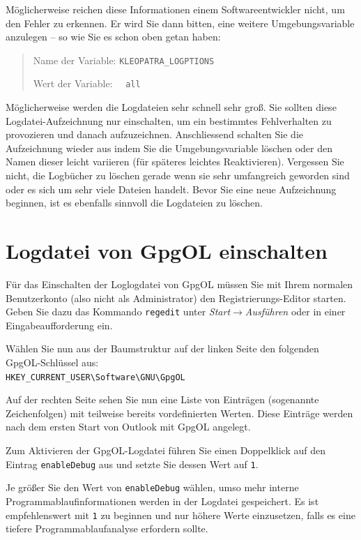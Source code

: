 \documentclass[a4paper,11pt, oneside,openright,titlepage,dvips]{scrbook}
\newcommand{\Menu}[1]{\emph{#1}}
\newcommand{\Filename}[1]{\texttt{#1}}
\newcounter{chapter}
\newcounter{section}[chapter]
\begin{document}
Möglicherweise reichen diese Informationen einem Softwareentwickler
nicht, um den Fehler zu erkennen. Er wird Sie dann bitten, eine weitere
Umgebungsvariable anzulegen
-- so wie Sie es schon oben getan haben:
\begin{quote}
    Name der Variable: \Filename{KLEOPATRA\_LOGPTIONS}

    Wert der Variable: ~~\Filename{all}
\end{quote}

Möglicherweise werden die Logdateien sehr schnell sehr groß.
Sie sollten diese Logdatei-Aufzeichnung nur einschalten, um
ein bestimmtes Fehlverhalten zu provozieren und danach aufzuzeichnen.
Anschliessend schalten
Sie die Aufzeichnung wieder aus indem Sie die Umgebungsvariable
löschen oder den Namen dieser leicht variieren (für späteres leichtes
Reaktivieren). Vergessen Sie nicht, die Logbücher zu löschen gerade
wenn sie sehr umfangreich geworden sind oder es sich um sehr viele
Dateien handelt. Bevor Sie eine neue Aufzeichnung beginnen, ist es
ebenfalls sinnvoll die Logdateien zu löschen.

\clearpage
\section{Logdatei von GpgOL einschalten}

Für das Einschalten der Loglogdatei von GpgOL müssen Sie mit Ihrem
normalen Benutzerkonto (also nicht als Administrator) den Registrierungs-Editor
starten. Geben Sie dazu das Kommando \verb:regedit: unter
\Menu{Start$\rightarrow$Ausführen} oder in einer Eingabeaufforderung ein.

Wählen Sie nun aus der Baumstruktur auf der linken Seite den
folgenden GpgOL-Schlüssel aus:\\
\verb:HKEY_CURRENT_USER\Software\GNU\GpgOL:

Auf der rechten Seite sehen Sie nun eine Liste von Einträgen
(sogenannte Zeichenfolgen) mit teilweise bereits vordefinierten Werten. 
Diese Einträge werden nach dem ersten Start von Outlook mit GpgOL
angelegt.

Zum Aktivieren der GpgOL-Logdatei führen Sie einen Doppelklick auf den Eintrag
\Filename{enableDebug} aus und setzte Sie dessen Wert auf \Filename{1}.

Je größer Sie den Wert von \Filename{enableDebug} wählen, umso mehr
interne Programmablaufinformationen werden in der Logdatei
gespeichert. Es ist empfehlenswert mit \Filename{1} zu beginnen und
nur höhere Werte einzusetzen, falls es eine tiefere
Programmablaufanalyse erfordern sollte.
\end{document}
